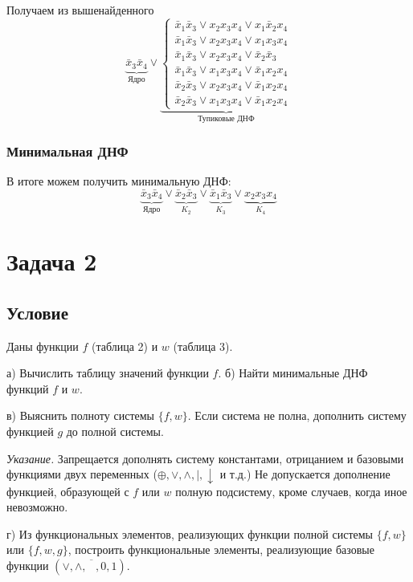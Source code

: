 Получаем из вышенайденного
\[
    \underbrace{\bar{x}_3 \bar{x}_4}_{\text{Ядро}} \lor
    \underbrace{
        \begin{cases}
            \bar{x}_1 \bar{x}_3 \lor x_2x_3x_4 \lor x_1\bar{x}_2x_4\\
            \bar{x}_1 \bar{x}_3 \lor x_2x_3x_4 \lor x_1x_3x_4\\
            \bar{x}_1 \bar{x}_3 \lor x_2x_3x_4 \lor \bar{x}_2 \bar{x}_3\\
            \bar{x}_1 \bar{x}_3 \lor x_1x_3x_4 \lor \bar{x}_1x_2x_4\\
            \bar{x}_2\bar{x}_3 \lor x_2x_3x_4 \lor \bar{x}_1x_2x_4\\
            \bar{x}_2\bar{x}_3 \lor x_1x_3x_4 \lor \bar{x}_1x_2x_4
        \end{cases}}_{\text{Тупиковые ДНФ}}
\] 


\subsection{Минимальная ДНФ}
В итоге можем получить минимальную ДНФ:
\[
    \boxed{ \underbrace{\bar{x}_3\bar{x}_4}_{\text{Ядро}}
    \lor \underbrace{\bar{x}_2\bar{x}_3}_{K_2} \lor \underbrace{\bar{x}_1 \bar{x}_3}_{K_3} \lor \underbrace{x_2x_3x_4}_{K_4}}
\]

\chapter{Задача 2}
\section{Условие}

Даны функции $f$ (таблица 2) и $w$ (таблица 3).

а) Вычислить таблицу значений функции $f$. б) Найти минимальные ДНФ функций $f$ и $w$.

в) Выяснить полноту системы $\{f, w\}$. Если система не полна, дополнить систему функцией
$g$ до полной системы.

\emph{Указание.} Запрещается дополнять систему константами, отрицанием и базовыми функциями
двух переменных ($\oplus, \lor, \land, |, \downarrow$ и т.д.)
Не допускается дополнение функцией, образующей
с $f$ или $w$ полную подсистему, кроме случаев, когда иное невозможно.

г) Из функциональных элементов, реализующих функции полной системы $\{f, w\}$ или $\{f, w, g\}$,
построить функциональные элементы, реализующие базовые функции $(\lor, \land, \overline{\phantom{A}},
0, 1)$.

